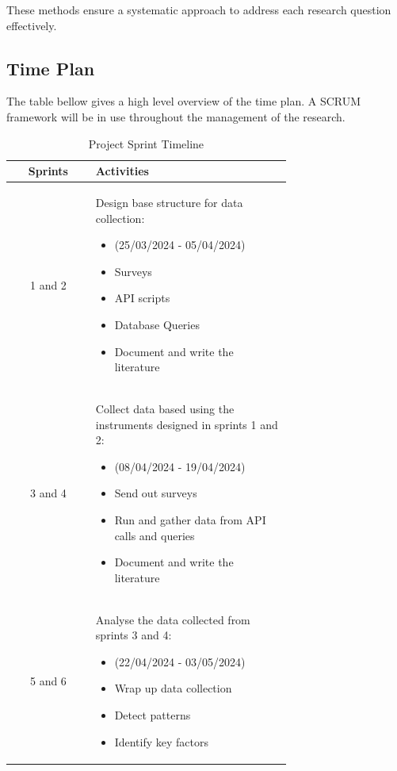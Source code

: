 \documentclass[conference]{IEEEtran}
\begin{document}
        These methods ensure a systematic approach to address each research question effectively.\\

    \subsection{Time Plan}
        The table bellow gives a high level overview of the time plan. A SCRUM framework will be in use throughout the management of the research. 
        \begin{table}[h]
            \centering
            \caption{Project Sprint Timeline}
            \label{tab:sprint_timeline}
            \begin{tabular}{|c|p{0.7\linewidth}|}
            \hline
            \textbf{Sprints} & \textbf{Activities} \\ \hline
            1 and 2  & Design base structure for data collection:
            \begin{itemize}
	      \item (25/03/2024 - 05/04/2024)
                \item Surveys
                \item API scripts
                \item Database Queries
                \item Document and write the literature
            \end{itemize} \\ \hline
            3 and 4  & Collect data based using the instruments designed in sprints 1 and 2:
            \begin{itemize}
                \item  (08/04/2024 - 19/04/2024) 
                \item Send out surveys
                \item Run and gather data from API calls and queries
                \item Document and write the literature
            \end{itemize} \\ \hline
            5 and 6   & Analyse the data collected from sprints 3 and 4:
            \begin{itemize}
                \item(22/04/2024 - 03/05/2024)
                \item Wrap up data collection
                \item Detect patterns
                \item Identify key factors

\end{itemize}
\end{tabular}
\end{table}
\end{document}
